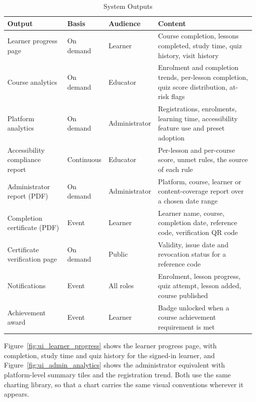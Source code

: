 \documentclass[12pt, oneside]{article} %
\newcommand{\tabbreak}{\hyphenpenalty=200\exhyphenpenalty=200\tolerance=4000\hbadness=10000\hspace{0pt}}
\begin{document}
\begin{table}[H]
\caption{System Outputs}
\label{tab:output_design}
\vspace{-4mm}
\begin{center}
\renewcommand{\arraystretch}{1.2}
\footnotesize
\begin{tabular}{|>{\raggedright\arraybackslash\tabbreak}p{3.32cm}|>{\raggedright\arraybackslash\tabbreak}p{1.99cm}|>{\raggedright\arraybackslash\tabbreak}p{2.0cm}|>{\raggedright\arraybackslash\tabbreak}p{5.59cm}|}
\hline
\textbf{Output} & \textbf{Basis} & \textbf{Audience} & \textbf{Content} \\
\hline \hline
Learner progress page & On demand & Learner & Course completion, lessons completed, study time, quiz history, visit history \\ \hline
Course analytics & On demand & Educator & Enrolment and completion trends, per-lesson completion, quiz score distribution, at-risk flags \\ \hline
Platform analytics & On demand & Administrator & Registrations, enrolments, learning time, accessibility feature use and preset adoption \\ \hline
Accessibility compliance report & Continuous & Educator & Per-lesson and per-course score, unmet rules, the source of each rule \\ \hline
Administrator report (PDF) & On demand & Administrator & Platform, course, learner or content-coverage report over a chosen date range \\ \hline
Completion certificate (PDF) & Event & Learner & Learner name, course, completion date, reference code, verification QR code \\ \hline
Certificate verification page & On demand & Public & Validity, issue date and revocation status for a reference code \\ \hline
Notifications & Event & All roles & Enrolment, lesson progress, quiz attempt, lesson added, course published \\ \hline
Achievement award & Event & Learner & Badge unlocked when a course achievement requirement is met \\ \hline
\end{tabular}
\end{center}
\end{table}

Figure~\ref{fig:ui_learner_progress} shows the learner progress page, with completion, study time and quiz history for the signed-in learner, and Figure~\ref{fig:ui_admin_analytics} shows the administrator equivalent with platform-level summary tiles and the registration trend. Both use the same charting library, so that a chart carries the same visual conventions wherever it appears.
\end{document}
